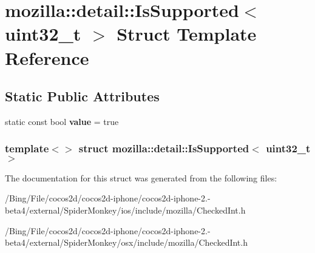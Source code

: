 \hypertarget{structmozilla_1_1detail_1_1_is_supported_3_01uint32__t_01_4}{\section{mozilla\-:\-:detail\-:\-:Is\-Supported$<$ uint32\-\_\-t $>$ Struct Template Reference}
\label{structmozilla_1_1detail_1_1_is_supported_3_01uint32__t_01_4}
}
\subsection*{Static Public Attributes}
\begin{DoxyCompactItemize}
\item 
\hypertarget{structmozilla_1_1detail_1_1_is_supported_3_01uint32__t_01_4_a9765cc6a68ae053105b492ccf734da09}{static const bool {\bfseries value} = true}\label{structmozilla_1_1detail_1_1_is_supported_3_01uint32__t_01_4_a9765cc6a68ae053105b492ccf734da09}

\end{DoxyCompactItemize}
\subsubsection*{template$<$$>$ struct mozilla\-::detail\-::\-Is\-Supported$<$ uint32\-\_\-t $>$}



The documentation for this struct was generated from the following files\-:\begin{DoxyCompactItemize}
\item 
/\-Bing/\-File/cocos2d/cocos2d-\/iphone/cocos2d-\/iphone-\/2.-\/beta4/external/\-Spider\-Monkey/ios/include/mozilla/Checked\-Int.\-h\item 
/\-Bing/\-File/cocos2d/cocos2d-\/iphone/cocos2d-\/iphone-\/2.-\/beta4/external/\-Spider\-Monkey/osx/include/mozilla/Checked\-Int.\-h\end{DoxyCompactItemize}
